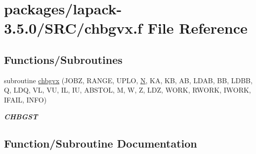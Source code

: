 \hypertarget{chbgvx_8f}{}\section{packages/lapack-\/3.5.0/\+S\+R\+C/chbgvx.f File Reference}
\label{chbgvx_8f}
\subsection*{Functions/\+Subroutines}
\begin{DoxyCompactItemize}
\item 
subroutine \hyperlink{chbgvx_8f_adc31cb38fcdd9a79731c5ca924c1756c}{chbgvx} (J\+O\+B\+Z, R\+A\+N\+G\+E, U\+P\+L\+O, \hyperlink{polmisc_8c_a0240ac851181b84ac374872dc5434ee4}{N}, K\+A, K\+B, A\+B, L\+D\+A\+B, B\+B, L\+D\+B\+B, Q, L\+D\+Q, V\+L, V\+U, I\+L, I\+U, A\+B\+S\+T\+O\+L, M, W, Z, L\+D\+Z, W\+O\+R\+K, R\+W\+O\+R\+K, I\+W\+O\+R\+K, I\+F\+A\+I\+L, I\+N\+F\+O)
\begin{DoxyCompactList}\small\item\em {\bfseries C\+H\+B\+G\+S\+T} \end{DoxyCompactList}\end{DoxyCompactItemize}


\subsection{Function/\+Subroutine Documentation}
\hypertarget{chbgvx_8f_adc31cb38fcdd9a79731c5ca924c1756c}{}
